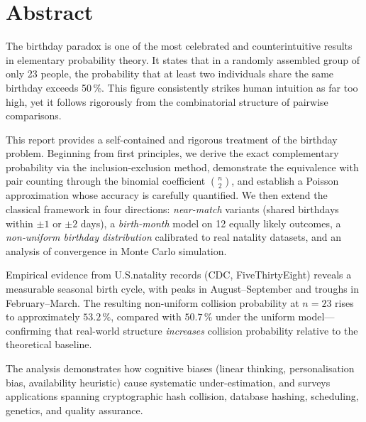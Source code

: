 \documentclass[12pt]{report}
\theoremstyle{definition}
\begin{document}
\chapter*{Abstract}

The birthday paradox is one of the most celebrated and counterintuitive results in
elementary probability theory.  It states that in a randomly assembled group of only
23 people, the probability that at least two individuals share the same birthday
exceeds 50\,\%.  This figure consistently strikes human intuition as far too high,
yet it follows rigorously from the combinatorial structure of pairwise comparisons.

This report provides a self-contained and rigorous treatment of the birthday problem.
Beginning from first principles, we derive the exact complementary probability via the
inclusion-exclusion method, demonstrate the equivalence with pair counting through the
binomial coefficient $\binom{n}{2}$, and establish a Poisson approximation whose
accuracy is carefully quantified.  We then extend the classical framework in four
directions: \emph{near-match} variants (shared birthdays within $\pm 1$ or $\pm 2$
days), a \emph{birth-month} model on 12 equally likely outcomes, a \emph{non-uniform
birthday distribution} calibrated to real natality datasets, and an analysis of
convergence in Monte Carlo simulation.

Empirical evidence from U.S.\@ natality records (CDC, FiveThirtyEight) reveals a
measurable seasonal birth cycle, with peaks in August–September and troughs in
February–March.  The resulting non-uniform collision probability at $n = 23$ rises to
approximately $53.2\,\%$, compared with $50.7\,\%$ under the uniform model—confirming
that real-world structure \emph{increases} collision probability relative to the
theoretical baseline.

The analysis demonstrates how cognitive biases (linear thinking, personalisation bias,
availability heuristic) cause systematic under-estimation, and surveys applications
spanning cryptographic hash collision, database hashing, scheduling, genetics, and
quality assurance.

\newpage

\tableofcontents
\newpage
\listoffigures
{}
\newpage
\end{document}
